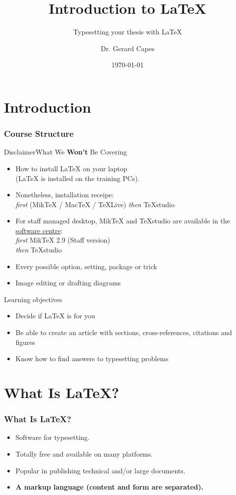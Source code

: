 \documentclass[12pt]{beamer}
\title{Introduction to \LaTeX}
\subtitle{Typesetting your thesis with \LaTeX}
\author{Dr. Gerard Capes}
\institute{Research IT\\University of Manchester}
\date{\today{}}
\begin{document}
\begin{frame}
	\titlepage
\end{frame}

\section{Introduction}

\begin{frame}
	\frametitle{Course Structure}
	\tableofcontents
\end{frame}

\begin{frame}{Disclaimer}{What We \textbf{Won't} Be Covering}
	\begin{itemize}
		\item How to install \LaTeX{} on your laptop\\
		(\LaTeX{} is installed on the training PCs).
		\item Nonetheless, installation receipe:\\ \emph{first} (MikTeX / MacTeX / TeXLive) \emph{then} TeXstudio
		\item For staff managed desktop, MikTeX and TeXstudio are available in the \href{http://softwarecentre.itservices.manchester.ac.uk/}{software centre}:\\
		\emph{first} MikTeX 2.9 (Staff version)\\
		\emph{then} TeXstudio
		\item Every possible option, setting, package or trick
		\item Image editing or drafting diagrams
	\end{itemize}
\end{frame}

\begin{frame}{Learning objectives}
	\begin{itemize}
		\item Decide if \LaTeX{} is for you
		\item Be able to create an article with sections, cross-references, citations and figures
		\item Know how to find answers to typesetting problems
	\end{itemize}
\end{frame}

\section{What Is \LaTeX?}

\begin{frame} \frametitle{What Is \LaTeX?}
	\begin{itemize}
		\item Software for typesetting.
		\item Totally free and available on many platforms.
		\item Popular in publishing technical and/or large documents.
		\item \textbf{A markup language (content and form are separated).}
	\end{itemize}
\end{frame}
\end{document}
